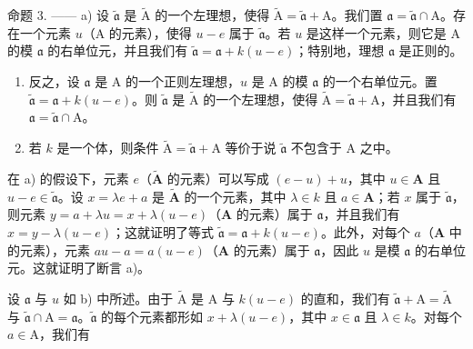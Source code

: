 命题 3. —— a) 设 \(\widetilde{\mathfrak{a}}\) 是 \(\widetilde{\mathrm{A}}\) 的一个左理想，使得 \(\widetilde{\mathrm{A}} = \widetilde{\mathfrak{a}} + \mathrm{A}\)。我们置 \(\mathfrak{a} = \widetilde{\mathfrak{a}} \cap \mathrm{A}\)。存在一个元素 \(u\)（\(\mathrm{A}\) 的元素），使得 \(u - e\) 属于 \(\widetilde{\mathfrak{a}}\)。若 \(u\) 是这样一个元素，则它是 \(\mathrm{A}\) 的模 \(\mathfrak{a}\) 的右单位元，并且我们有 \(\widetilde{\mathfrak{a}} = \mathfrak{a} + k(u - e)\)；特别地，理想 \(\mathfrak{a}\) 是正则的。

\begin{enumerate}
\def\labelenumi{\alph{enumi})}
\setcounter{enumi}{1}
\item
  反之，设 \(\mathfrak{a}\) 是 A 的一个正则左理想，\(u\) 是 A 的模 \(\mathfrak{a}\) 的一个右单位元。置 \(\widetilde{\mathfrak{a}} = \mathfrak{a} + k(u - e)\)。则 \(\widetilde{\mathfrak{a}}\) 是 \(\widetilde{\mathrm{A}}\) 的一个左理想，使得 \(\widetilde{\mathrm{A}} = \widetilde{\mathfrak{a}} + \mathrm{A}\)，并且我们有 \(\mathfrak{a} = \widetilde{\mathfrak{a}} \cap \mathrm{A}\)。
\item
  若 \(k\) 是一个体，则条件 \(\widetilde{\mathrm{A}} = \widetilde{\mathfrak{a}} + \mathrm{A}\) 等价于说 \(\widetilde{\mathfrak{a}}\) 不包含于 \(\mathrm{A}\) 之中。
\end{enumerate}

在 a) 的假设下，元素 \(e\)（\(\widetilde{\mathbf{A}}\) 的元素）可以写成 \((e - u) + u\)，其中 \(u \in \mathbf{A}\) 且 \(u - e \in \widetilde{\mathfrak{a}}\)。设 \(x = \lambda e + a\) 是 \(\widetilde{\mathbf{A}}\) 的一个元素，其中 \(\lambda \in k\) 且 \(a \in \mathbf{A}\)；若 \(x\) 属于 \(\widetilde{\mathfrak{a}}\)，则元素 \(y = a + \lambda u = x + \lambda (u - e)\)（\(\mathbf{A}\) 的元素）属于 \(\mathfrak{a}\)，并且我们有 \(x = y - \lambda (u - e)\)；这就证明了等式 \(\widetilde{\mathfrak{a}} = \mathfrak{a} + k(u - e)\)。此外，对每个 \(a\)（\(\mathbf{A}\) 中的元素），元素 \(au - a = a(u - e)\)（\(\mathbf{A}\) 的元素）属于 \(\mathfrak{a}\)，因此 \(u\) 是模 \(\mathfrak{a}\) 的右单位元。这就证明了断言 a)。

设 \(\mathfrak{a}\) 与 \(u\) 如 b) 中所述。由于 \(\widetilde{\mathrm{A}}\) 是 \(\mathrm{A}\) 与 \(k(u - e)\) 的直和，我们有 \(\widetilde{\mathfrak{a}} + \mathrm{A} = \widetilde{\mathrm{A}}\) 与 \(\widetilde{\mathfrak{a}} \cap \mathrm{A} = \mathfrak{a}\)。\(\widetilde{\mathfrak{a}}\) 的每个元素都形如 \(x + \lambda (u - e)\)，其中 \(x \in \mathfrak{a}\) 且 \(\lambda \in k\)。对每个 \(a \in \mathrm{A}\)，我们有

